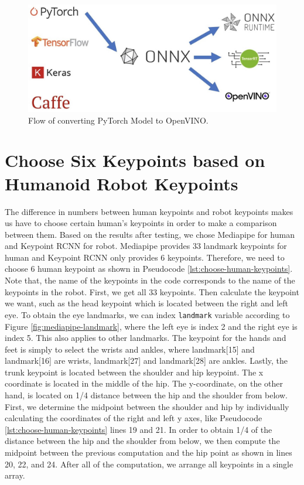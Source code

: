 \begin{figure}[ht]
  \centering
  \includegraphics[scale=0.4]{gambar/pytorch-onnx-openvino.jpg}
  \caption{Flow of converting PyTorch Model to OpenVINO.}
  \label{fig:pytorch-to-openvino}
\end{figure}


\section{Choose Six Keypoints based on Humanoid Robot Keypoints}
\label{sec:choose-keypoints}

The difference in numbers between human keypoints and robot keypoints makes us have to choose certain human's keypoints in order to make a comparison between them.
Based on the results after testing, we chose Mediapipe for human and Keypoint RCNN for robot. Mediapipe provides 33 landmark keypoints for human and Keypoint RCNN only provides 6 keypoints.
Therefore, we need to choose 6 human keypoint as shown in Pseudocode \ref{lst:choose-human-keypoints}.
Note that, the name of the keypoints in the code corresponds to the name of the keypoints in the robot. First, we get all 33 keypoints. Then calculate the keypoint we want, such as the head keypoint which is located between the right and left eye.
To obtain the eye landmarks, we can index \verb|landmark| variable according to Figure \ref{fig:mediapipe-landmark}, where the left eye is index 2 and the right eye is index 5. This also applies to other landmarks.
The keypoint for the hands and feet is simply to select the wrists and ankles, where landmark[15] and landmark[16] are wrists, landmark[27] and landmark[28] are ankles.
Lastly, the trunk keypoint is located between the shoulder and hip keypoint. The x coordinate is located in the middle of the hip. The y-coordinate, on the other hand, is located on 1/4 distance between the hip and the shoulder from below.
First, we determine the midpoint between the shoulder and hip by individually calculating the coordinates of the right and left y axes, like Pseudocode \ref{lst:choose-human-keypoints} lines 19 and 21. In order to obtain 1/4 of the distance between the hip and the shoulder from below, we then compute the midpoint between the previous computation and the hip point as shown in lines 20, 22, and 24.
After all of the computation, we arrange all keypoints in a single array.

